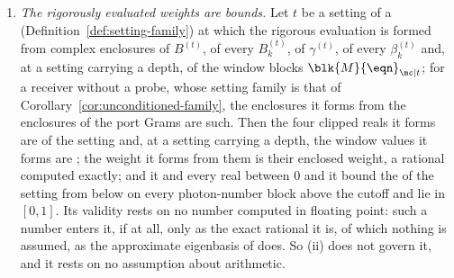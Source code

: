 \begin{theorem}
\begin{enumerate}[label=(\roman*),leftmargin=3.0em]
  is its centre, and on the  the entries that
  Theorem~\ref{thm:exact-blocks} names have radius zero when the port Grams
  are enclosed exactly. A positive semidefiniteness or a positive
  definiteness established through
  \,(i) on such an enclosure with a
  Hermitian centre holds of the block itself. The floating-point block
  matrices are evaluations of the same blocks and fall under (ii): this
  contract asserts no bound on their difference from the blocks, so no
  decision about the blocks is taken on them.
\item \emph{The rigorously evaluated weights are bounds.} Let $t$ be a
  setting of a  (Definition~\ref{def:setting-family}) at
  which the rigorous evaluation is formed from complex enclosures of
  $B^{(t)}$, of every $B^{(t)}_k$, of $\gamma^{(t)}$, of every
  $\beta^{(t)}_k$ and, at a setting carrying a depth, of the window blocks
  $\blk{M}{\eqn}_{\mc|t}$; for a receiver without a probe, whose setting
  family is that of Corollary~\ref{cor:unconditioned-family}, the enclosures
  it forms from the enclosures of the port Grams are such. Then the four
  clipped reals it forms
  are  of the setting and, at a setting carrying a
  depth, the window values it forms are ; the
  weight it forms from them is their enclosed weight, a rational computed
  exactly; and it and every real between $0$
  and it bound the  of the setting from below on every
  photon-number block above the cutoff and lie in $[0,1]$. Its validity rests
  on no number computed in floating point: such a number enters it, if at
  all, only as the exact rational it is, of which nothing is assumed, as the
  approximate eigenbasis of 
  does. So (ii) does not govern it, and it rests on no assumption about
  arithmetic.
\end{enumerate}
\end{theorem}

